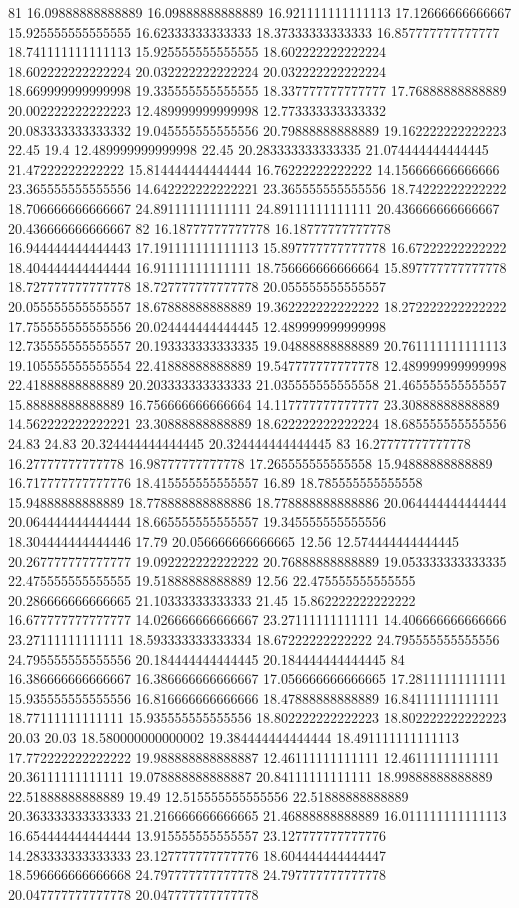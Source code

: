 81 16.09888888888889 16.09888888888889 16.921111111111113 17.12666666666667 15.925555555555555 16.62333333333333 18.37333333333333 16.857777777777777 18.741111111111113 15.925555555555555 18.602222222222224 18.602222222222224 20.032222222222224 20.032222222222224 18.669999999999998 19.335555555555555 18.337777777777777 17.76888888888889 20.002222222222223 12.489999999999998 12.773333333333332 20.083333333333332 19.045555555555556 20.79888888888889 19.162222222222223 22.45 19.4 12.489999999999998 22.45 20.283333333333335 21.074444444444445 21.47222222222222 15.814444444444444 16.76222222222222 14.156666666666666 23.365555555555556 14.642222222222221 23.365555555555556 18.74222222222222 18.706666666666667 24.89111111111111 24.89111111111111 20.436666666666667 20.436666666666667
82 16.18777777777778 16.18777777777778 16.944444444444443 17.191111111111113 15.897777777777778 16.67222222222222 18.404444444444444 16.91111111111111 18.756666666666664 15.897777777777778 18.727777777777778 18.727777777777778 20.055555555555557 20.055555555555557 18.67888888888889 19.362222222222222 18.272222222222222 17.755555555555556 20.024444444444445 12.489999999999998 12.735555555555557 20.193333333333335 19.04888888888889 20.761111111111113 19.105555555555554 22.41888888888889 19.547777777777778 12.489999999999998 22.41888888888889 20.203333333333333 21.035555555555558 21.465555555555557 15.88888888888889 16.756666666666664 14.117777777777777 23.30888888888889 14.562222222222221 23.30888888888889 18.622222222222224 18.685555555555556 24.83 24.83 20.324444444444445 20.324444444444445
83 16.27777777777778 16.27777777777778 16.98777777777778 17.265555555555558 15.94888888888889 16.717777777777776 18.415555555555557 16.89 18.785555555555558 15.94888888888889 18.778888888888886 18.778888888888886 20.064444444444444 20.064444444444444 18.665555555555557 19.345555555555556 18.304444444444446 17.79 20.056666666666665 12.56 12.574444444444445 20.267777777777777 19.092222222222222 20.76888888888889 19.053333333333335 22.475555555555555 19.51888888888889 12.56 22.475555555555555 20.286666666666665 21.10333333333333 21.45 15.862222222222222 16.677777777777777 14.026666666666667 23.27111111111111 14.406666666666666 23.27111111111111 18.593333333333334 18.67222222222222 24.795555555555556 24.795555555555556 20.184444444444445 20.184444444444445
84 16.386666666666667 16.386666666666667 17.056666666666665 17.28111111111111 15.935555555555556 16.816666666666666 18.47888888888889 16.84111111111111 18.77111111111111 15.935555555555556 18.802222222222223 18.802222222222223 20.03 20.03 18.580000000000002 19.384444444444444 18.491111111111113 17.772222222222222 19.988888888888887 12.46111111111111 12.46111111111111 20.36111111111111 19.078888888888887 20.84111111111111 18.99888888888889 22.51888888888889 19.49 12.515555555555556 22.51888888888889 20.363333333333333 21.216666666666665 21.46888888888889 16.011111111111113 16.654444444444444 13.915555555555557 23.127777777777776 14.283333333333333 23.127777777777776 18.604444444444447 18.596666666666668 24.797777777777778 24.797777777777778 20.047777777777778 20.047777777777778
